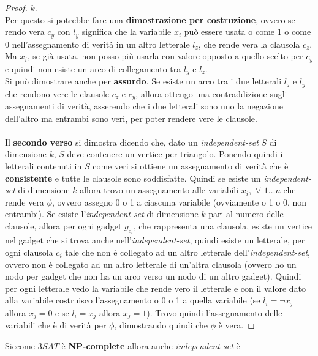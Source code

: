 \documentclass[a4paper,12pt, oneside]{book}
\begin{document}
\begin{esempio}
\begin{proof}
    $k$.\\
    Per questo si potrebbe fare una \textbf{dimostrazione per costruzione},
    ovvero se rendo vera $c_y$ con $l_y$ significa che la variabile $x_i$ può
    essere usata o come 1 o come 0 nell'assegnamento di verità in un altro
    letterale $l_z$, che rende vera la clausola $c_z$. Ma $x_i$, se già usata,
    non posso più usarla con valore opposto a quello scelto per $c_y$ e quindi
    non esiste un arco di collegamento tra $l_y$ e $l_z$.\\
    Si può dimostrare anche per \textbf{assurdo}. Se esiste un arco tra i due
    letterali $l_z$ e $l_y$ che rendono vere le clausole $c_z$ e $c_y$,
    allora ottengo una contraddizione sugli assegnamenti di verità, asserendo
    che i due letterali sono uno la negazione dell'altro ma entrambi sono
    veri, per poter rendere vere le clausole. 
    \\
    \\
    Il \textbf{secondo verso} si dimostra dicendo che, dato un
    \textit{independent-set} 
    $S$ di dimensione $k$, $S$ deve contenere un vertice per triangolo. Ponendo
    quindi i letterali contenuti in $S$ come veri si ottiene un assegnamento di
    verità che è \textbf{consistente} e tutte le clausole sono soddisfatte.
    Quindi se esiste un \textit{independent-set} di dimensione $k$ allora trovo
    un assegnamento alle variabili $x_i,\,\,\forall \,\,1\ldots n$ che rende
    vera $\phi$, ovvero assegno 0 o 1 a ciascuna variabile (ovviamente o 1 o 0,
    non entrambi). Se esiste l'\textit{independent-set} di dimensione $k$ pari
    al numero delle clausole, allora per ogni gadget $g_{c_i}$,
    che rappresenta una clausola, esiste un vertice nel gadget che si trova
    anche nell'\textit{independent-set}, quindi esiste un letterale, per ogni
    clausola $c_i$ tale che non è collegato ad un altro letterale
    dell'\textit{independent-set}, ovvero non è collegato ad un altro letterale
    di un'altra clausola (ovvero ho un nodo per gadget che non ha un arco verso
    un nodo di un altro gadget). Quindi per ogni letterale vedo la variabile che
    rende vero il letterale e con il valore dato alla variabile costruisco
    l'assegnamento o 0 o 1 a quella variabile (se $l_i=\neg x_j$ allora
    $x_j=0$ e se $l_i= x_j$ allora $x_j=1$). Trovo quindi l'assegnamento delle
    variabili che è di verità per $\phi$, dimostrando quindi che $\phi$ è vera.
  \end{proof}
\end{esempio}
Siccome $3SAT$ è \textbf{NP-complete} allora anche \textit{independent-set} è
\end{document}
